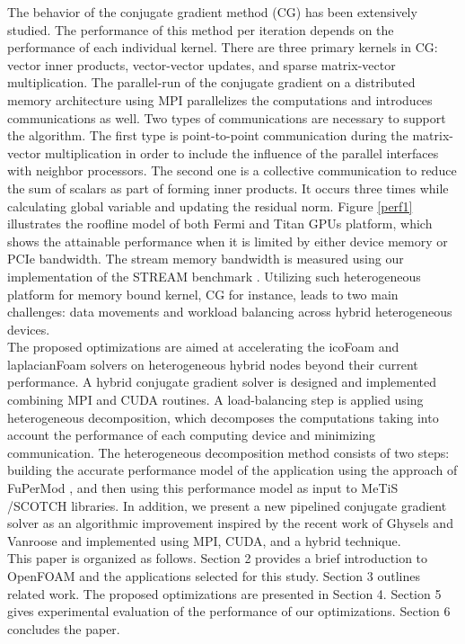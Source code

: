 \documentclass[3p,times]{elsarticle}
\begin{document}
The behavior of the conjugate gradient method (CG) has been extensively studied. The performance of this method per iteration depends on the performance of each individual kernel. There are three primary kernels in CG: vector inner products, vector-vector updates, and sparse matrix-vector multiplication. The parallel-run of the conjugate gradient on a distributed memory architecture using MPI parallelizes the computations and introduces communications as well. Two types of communications are necessary to support the algorithm. The first type is point-to-point communication during the matrix-vector multiplication in order to include the influence of the parallel interfaces with neighbor processors. The second one is a collective communication to reduce the sum of scalars as part of forming inner products. It occurs three times while calculating global variable and updating the residual norm. Figure \ref{perf1} illustrates the roofline model \cite{williams2009roofline} of both Fermi and Titan GPUs platform, which shows the attainable performance when it is limited by either device memory or PCIe bandwidth. The stream memory bandwidth is measured using our implementation of the STREAM benchmark \cite{streambench}. Utilizing such heterogeneous platform for memory bound kernel, CG for instance, leads to two main challenges: data movements and workload balancing across hybrid heterogeneous devices. \\

The proposed optimizations are aimed at accelerating the icoFoam and laplacianFoam solvers on heterogeneous hybrid nodes beyond their current performance. A hybrid conjugate gradient solver is designed and implemented combining MPI and CUDA routines. A load-balancing step is applied using heterogeneous decomposition, which decomposes the computations taking into account the performance of each computing device and minimizing communication. The heterogeneous decomposition method consists of two steps: building the accurate performance model of the application using the approach of FuPerMod \cite{fupermode, fupermode2, fupermode3, fpm_14}, and then using this performance model as input to MeTiS \cite{MeTiS} /SCOTCH \cite{scotch} libraries. In addition, we present a new pipelined conjugate gradient solver as an algorithmic improvement inspired by the recent work of Ghysels and Vanroose \cite{pipecg} and implemented using MPI, CUDA, and a hybrid technique. \\

This paper is organized as follows. Section 2 provides a brief introduction to OpenFOAM and the applications selected for this study. Section 3 outlines related work. The proposed optimizations are presented in Section 4. Section 5 gives experimental evaluation of the performance of our optimizations. Section 6 concludes the paper.
\end{document}
